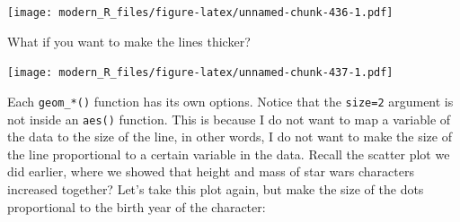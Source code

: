 \documentclass[]{gitbook}
\newenvironment{Shaded}{\begin{snugshade}}{\end{snugshade}}
\newcommand{\DataTypeTok}[1]{\textcolor[rgb]{0.13,0.29,0.53}{#1}}
\newcommand{\DecValTok}[1]{\textcolor[rgb]{0.00,0.00,0.81}{#1}}
\newcommand{\KeywordTok}[1]{\textcolor[rgb]{0.13,0.29,0.53}{\textbf{#1}}}
\newcommand{\NormalTok}[1]{#1}
\newcommand{\OperatorTok}[1]{\textcolor[rgb]{0.81,0.36,0.00}{\textbf{#1}}}
\newcommand{\StringTok}[1]{\textcolor[rgb]{0.31,0.60,0.02}{#1}}
\begin{document}
\begin{Shaded}
\end{Shaded}

\texttt{[image: modern\_R\_files/figure-latex/unnamed-chunk-436-1.pdf]}

What if you want to make the lines thicker?

\begin{Shaded}
\end{Shaded}

\texttt{[image: modern\_R\_files/figure-latex/unnamed-chunk-437-1.pdf]}

Each \texttt{geom\_*()} function has its own options. Notice that the \texttt{size=2} argument is not inside
an \texttt{aes()} function. This is because I do not want to map a variable of the data to the size
of the line, in other words, I do not want to make the size of the line proportional to a certain
variable in the data. Recall the scatter plot we did earlier, where we showed that height and mass of
star wars characters increased together? Let's take this plot again, but make the size of the dots proportional
to the birth year of the character:
\end{document}
